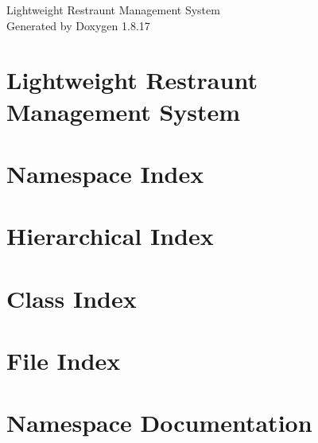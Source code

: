 \let\mypdfximage\pdfximage\def\pdfximage{\immediate\mypdfximage}\documentclass[twoside]{book}
\newcommand{\+}{\discretionary{\mbox{\scriptsize$\hookleftarrow$}}{}{}}
\newcommand{\clearemptydoublepage}{%
  \newpage{\pagestyle{empty}\cleardoublepage}%
}
\begin{document}
\hypersetup{pageanchor=false,
             bookmarksnumbered=true,
             pdfencoding=unicode
            }
\begin{titlepage}
\vspace*{7cm}
\begin{center}%
{\Large Lightweight Restraunt Management System }\\
\vspace*{1cm}
{\large Generated by Doxygen 1.8.17}\\
\end{center}
\end{titlepage}
\clearemptydoublepage
{}
\tableofcontents
\clearemptydoublepage
{}
\hypersetup{pageanchor=true}

\chapter{Lightweight Restraunt Management System}
\label{index}\hypertarget{index}{}
\chapter{Namespace Index}

\chapter{Hierarchical Index}

\chapter{Class Index}

\chapter{File Index}

\chapter{Namespace Documentation}


























\end{document}
